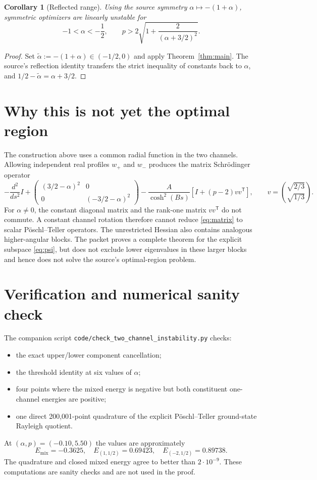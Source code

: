 \documentclass[11pt]{article}
\newtheorem{corollary}[theorem]{Corollary}
\begin{document}
\begin{corollary}[Reflected range]
Using the source symmetry $\alpha\mapsto-(1+\alpha)$, symmetric optimizers are
linearly unstable for
\[
 -1<\alpha<-\frac12,
 \qquad
 p>2\sqrt{1+\frac{2}{(\alpha+3/2)^2}}.
\]
\end{corollary}

\begin{proof}
Set $\widetilde\alpha:=-(1+\alpha)\in(-1/2,0)$ and apply
Theorem~\ref{thm:main}.  The source's reflection identity transfers the strict
inequality of constants back to $\alpha$, and
$1/2-\widetilde\alpha=\alpha+3/2$.
\end{proof}

\clearpage
\section{Why this is not yet the optimal region}

The construction above uses a common radial function in the two channels.
Allowing independent real profiles $w_+$ and $w_-$ produces the matrix
Schr\"odinger operator
\begin{equation}\label{eq:matrix}
 -\frac{d^2}{ds^2}I
 +\begin{pmatrix}
 (3/2-\alpha)^2&0\\0&(-3/2-\alpha)^2
 \end{pmatrix}
 -\frac{A}{\cosh^2(Bs)}
 \left[I+(p-2)vv^{\mathsf T}\right],
 \qquad
 v=\binom{\sqrt{2/3}}{\sqrt{1/3}}.
\end{equation}
For $\alpha\ne0$, the constant diagonal matrix and the rank-one matrix
$vv^{\mathsf T}$ do not commute.  A constant channel rotation therefore
cannot reduce \eqref{eq:matrix} to scalar P\"oschl--Teller operators.  The
unrestricted Hessian also contains analogous higher-angular blocks.  The
packet proves a complete theorem for the explicit subspace \eqref{eq:psi}, but
does not exclude lower eigenvalues in these larger blocks and hence does not
solve the source's optimal-region problem.

\section{Verification and numerical sanity check}

The companion script
\texttt{code/check\_two\_channel\_instability.py} checks:
\begin{itemize}
 \item the exact upper/lower component cancellation;
 \item the threshold identity at six values of $\alpha$;
 \item four points where the mixed energy is negative but both constituent
 one-channel energies are positive;
 \item one direct 200,001-point quadrature of the explicit P\"oschl--Teller
 ground-state Rayleigh quotient.
\end{itemize}
At $(\alpha,p)=(-0.10,5.50)$ the values are approximately
\[
 E_{\mathrm{mix}}=-0.3625,
 \quad E_{(1,1/2)}=0.69423,
 \quad E_{(-2,1/2)}=0.89738.
\]
The quadrature and closed mixed energy agree to better than $2\cdot10^{-9}$.
These computations are sanity checks and are not used in the proof.
\end{document}
